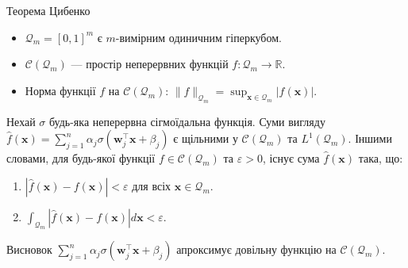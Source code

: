 \documentclass{zkdl-presentation-template}
\begin{document}
    \begin{frame}{Теорема Цибенко}
        \begin{itemize}
            \item $\mathcal{Q}_m = [0,1]^m$ є $m$-вимірним одиничним гіперкубом.
            \item $\mathcal{C}(\mathcal{Q}_m)$ --- простір неперервних функцій $f: \mathcal{Q}_m \to \mathbb{R}$.
            \item Норма функції $f$ на $\mathcal{C}(\mathcal{Q}_m)$: $\|f\|_{\mathcal{Q}_m} = \sup_{\boldsymbol{x} \in \mathcal{Q}_m} |f(\boldsymbol{x})|$.
        \end{itemize}

        \begin{theorem}[Цибенко]
            Нехай $\sigma$ будь-яка неперервна сігмоїдальна функція. Суми вигляду
            $\hat{f}(\boldsymbol{x}) = \sum_{j=1}^n
            \alpha_j\sigma(\boldsymbol{w}_j^{\top}\boldsymbol{x} + \beta_j)$ є щільними у
            $\mathcal{C}(\mathcal{Q}_m)$ та $L^1(\mathcal{Q}_m)$. Іншими словами, для
            будь-якої функції $f \in \mathcal{C}(\mathcal{Q}_m)$ та $\varepsilon > 0$,
            існує сума $\hat{f}(\boldsymbol{x})$ така, що:
            \begin{enumerate}
                \item $|\hat{f}(\boldsymbol{x})-f(\boldsymbol{x})|<\varepsilon$ для всіх $\boldsymbol{x} \in
                \mathcal{Q}_m$.
                \item $\int_{\mathcal{Q}_m}|\hat{f}(\boldsymbol{x})-f(\boldsymbol{x})|d\boldsymbol{x} <
                \varepsilon$.
            \end{enumerate}
        \end{theorem}

        \begin{alertblock}{Висновок}
            $\sum_{j=1}^n
            \alpha_j\sigma(\boldsymbol{w}_j^{\top}\boldsymbol{x} + \beta_j)$ апроксимує 
            довільну функцію на $\mathcal{C}(\mathcal{Q}_m)$.
        \end{alertblock}
    \end{frame}
\end{document}
